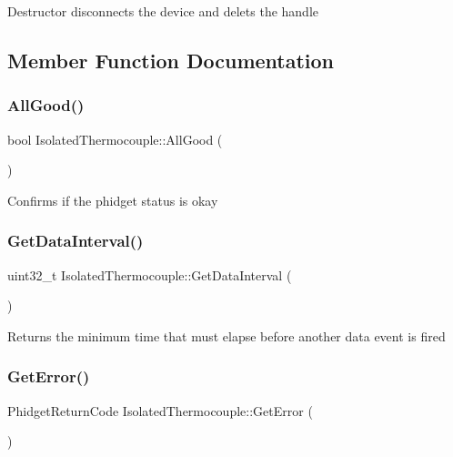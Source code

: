 Destructor disconnects the device and delets the handle

\subsection{Member Function Documentation}
\mbox{\label{classIsolatedThermocouple_abb71c477ed8dd8fc1275b35a9ac66a63}} 
\subsubsection{\texorpdfstring{All\+Good()}{AllGood()}}
{\footnotesize\ttfamily bool Isolated\+Thermocouple\+::\+All\+Good (\begin{DoxyParamCaption}{ }\end{DoxyParamCaption})\hspace{0.3cm}{\ttfamily [inline]}}

Confirms if the phidget status is okay\mbox{\label{classIsolatedThermocouple_abda8f7448a0dc141475e81e8a08a5204}} 
\subsubsection{\texorpdfstring{Get\+Data\+Interval()}{GetDataInterval()}}
{\footnotesize\ttfamily uint32\+\_\+t Isolated\+Thermocouple\+::\+Get\+Data\+Interval (\begin{DoxyParamCaption}{ }\end{DoxyParamCaption})\hspace{0.3cm}{\ttfamily [inline]}}

Returns the minimum time that must elapse before another data event is fired\mbox{\label{classIsolatedThermocouple_a3472314d4a3a3ae8ae01c9d46f43e029}} 
\subsubsection{\texorpdfstring{Get\+Error()}{GetError()}}
{\footnotesize\ttfamily Phidget\+Return\+Code Isolated\+Thermocouple\+::\+Get\+Error (\begin{DoxyParamCaption}{ }\end{DoxyParamCaption})\hspace{0.3cm}{\ttfamily [inline]}}

